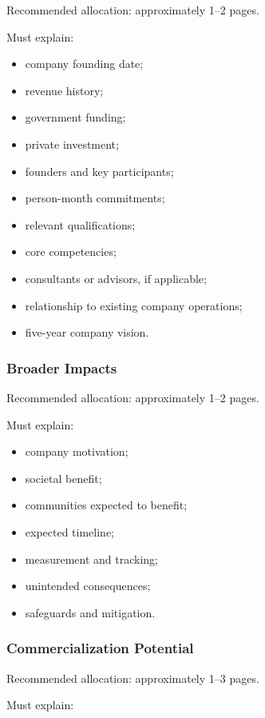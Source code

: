 \documentclass[11pt,letterpaper]{article}
\begin{document}
Recommended allocation: approximately 1--2 pages.

Must explain:

\begin{itemize}[leftmargin=0.25in]
    \item company founding date;
    \item revenue history;
    \item government funding;
    \item private investment;
    \item founders and key participants;
    \item person-month commitments;
    \item relevant qualifications;
    \item core competencies;
    \item consultants or advisors, if applicable;
    \item relationship to existing company operations;
    \item five-year company vision.
\end{itemize}

\subsubsection*{Broader Impacts}

Recommended allocation: approximately 1--2 pages.

Must explain:

\begin{itemize}[leftmargin=0.25in]
    \item company motivation;
    \item societal benefit;
    \item communities expected to benefit;
    \item expected timeline;
    \item measurement and tracking;
    \item unintended consequences;
    \item safeguards and mitigation.
\end{itemize}

\subsubsection*{Commercialization Potential}

Recommended allocation: approximately 1--3 pages.

Must explain:
\end{document}

